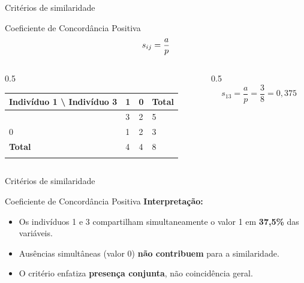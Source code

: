 \documentclass[
  ignorenonframetext,
  aspectratio=169,
]{beamer}
\newcounter{none} %
\providecommand{\tightlist}{%
  \setlength{\itemsep}{0pt}\setlength{\parskip}{0pt}}
\begin{document}
\begin{frame}{Critérios de similaridade}
\protect{}\label{crituxe9rios-de-similaridade-2}
\begin{block}{Coeficiente de Concordância Positiva}
\protect{}\label{coeficiente-de-concorduxe2ncia-positiva}
\[\Large s_{ij} = \displaystyle{\frac{a}{p}}\]

\begin{columns}[T]
\begin{column}{0.5\linewidth}
{\def\LTcaptype{none} %
\begin{longtable}[]{@{}llll@{}}
\toprule\noalign{}
Indivíduo 1 \textbackslash{} Indivíduo 3 & 1 & 0 & Total \\
\midrule\noalign{}
\endhead
1 & 3 & 2 & 5 \\
0 & 1 & 2 & 3 \\
\textbf{Total} & 4 & 4 & 8 \\
\bottomrule\noalign{}
\end{longtable}
}
\end{column}

\begin{column}{0.5\linewidth}
\[
s_{13} = \dfrac{a}{p}= 
               \dfrac{3}{8} = 0,375
\]
\end{column}
\end{columns}
\end{block}
\end{frame}

\begin{frame}{Critérios de similaridade}
\protect{}\label{crituxe9rios-de-similaridade-3}
\begin{block}{Coeficiente de Concordância Positiva}
\protect{}\label{coeficiente-de-concorduxe2ncia-positiva-1}
\textbf{Interpretação:}

\begin{itemize}
\tightlist
\item
  Os indivíduos 1 e 3 compartilham simultaneamente o valor 1 em
  \textbf{37,5\%} das variáveis.
\item
  Ausências simultâneas (valor 0) \textbf{não contribuem} para a
  similaridade.
\item
  O critério enfatiza \textbf{presença conjunta}, não coincidência
  geral.
\end{itemize}
\end{block}
\end{frame}
\end{document}
